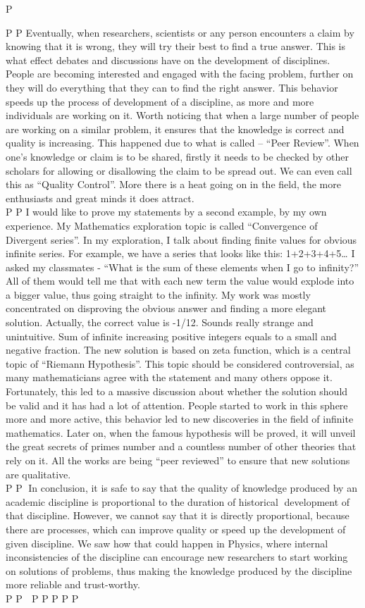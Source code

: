P \documentclass[12pt,a4paper]{article}
\begin{document}
P 
P Eventually, when researchers, scientists or any person encounters a claim by knowing that it is wrong, they will try their best to find a true answer. This is what effect debates and discussions have on the development of disciplines. People are becoming interested and engaged with the facing problem, further on they will do everything that they can to find the right answer. This behavior speeds up the process of development of a discipline, as more and more individuals are working on it. Worth noticing that when a large number of people are working on a similar problem, it ensures that the knowledge is correct and quality is increasing. This happened due to what is called – “Peer Review”\cite{tok}. When one’s knowledge or claim is to be shared, firstly it needs to be checked by other scholars for allowing or disallowing the claim to be spread out. We can even call this as “Quality Control”. More there is a heat going on in the field, the more enthusiasts and great minds it does attract. \\
P 
P I would like to prove my statements by a second example, by my own experience. My Mathematics exploration topic is called “Convergence of Divergent series”\cite{cods}. In my exploration, I talk about finding finite values for obvious infinite series. For example, we have a series that looks like this: 1+2+3+4+5… I asked my classmates - “What is the sum of these elements when I go to infinity?” All of them would tell me that with each new term the value would explode into a bigger value, thus going straight to the infinity. My work was mostly concentrated on disproving the obvious answer and finding a more elegant solution. Actually, the correct value is -1/12. Sounds really strange and unintuitive. Sum of infinite increasing positive integers equals to a small and negative fraction. The new solution is based on zeta function\cite{zeta}, which is a central topic of “Riemann Hypothesis”\cite{hypot}. This topic should be considered controversial, as many mathematicians agree with the statement and many others oppose it. Fortunately, this led to a massive discussion about whether the solution should be valid and it has had a lot of attention. People started to work in this sphere more and more active, this behavior led to new discoveries in the field of infinite mathematics. Later on, when the famous hypothesis will be proved, it will unveil the great secrets of primes number and a countless number of other theories that rely on it. All the works are being “peer reviewed” to ensure that new solutions are qualitative.\\
P 
P In conclusion, it is safe to say that the quality of knowledge produced by an academic discipline is proportional to the duration of historical development of that discipline. However, we cannot say that it is directly proportional, because there are processes, which can improve quality or speed up the development of given discipline. We saw how that could happen in Physics, where internal inconsistencies of the discipline can encourage new researchers to start working on solutions of problems, thus making the knowledge produced by the discipline more reliable and trust-worthy. \\
P 
P \singlespacing
P \newpage
P 
P 
P 
P 
\end{document}
